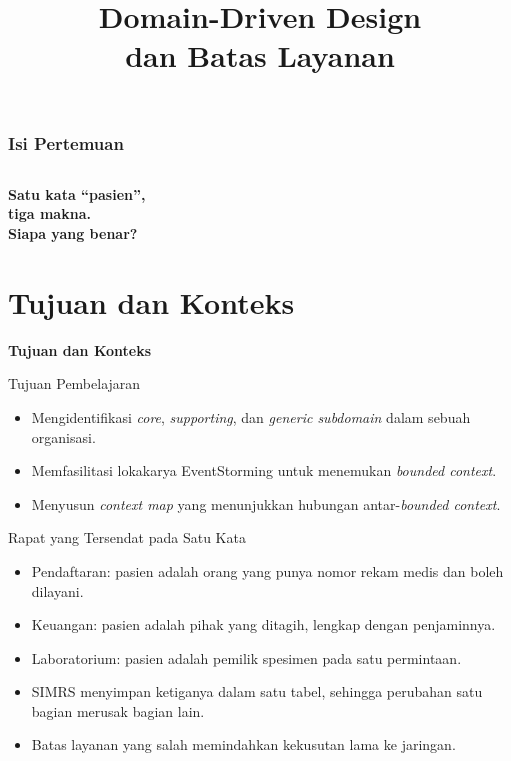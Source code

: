 \documentclass[aspectratio=169, table, 12pt]{beamer}
\title{\Huge Domain-Driven Design\\ \vspace{10pt} dan Batas Layanan}
\begin{document}
\frame{\titlepage}

\begin{frame}
  \frametitle{Isi Pertemuan}
  \vspace{14pt}
  \begin{columns}[t]
    {\small\tableofcontents[sections={1-4}]}

    {\small\tableofcontents[sections={5-8}]}
  \end{columns}
\end{frame}

\begin{frame}{\hfill}
  \centering
  \Huge{\textbf{Satu kata ``pasien'',\\tiga makna.\\Siapa yang benar?}}
\end{frame}

\section{Tujuan dan Konteks}

\begin{frame}{\hfill}
  \centering
  \Huge{\textbf{Tujuan dan Konteks}}
\end{frame}

\begin{frame}{{\Large Tujuan Pembelajaran}}
  \vspace{10pt}
  \begin{itemize}
    \item Mengidentifikasi \textit{core}, \textit{supporting}, dan \textit{generic
          subdomain} dalam sebuah organisasi.
    \item Memfasilitasi lokakarya EventStorming untuk menemukan \textit{bounded
          context}.
    \item Menyusun \textit{context map} yang menunjukkan hubungan
          antar-\textit{bounded context}.
  \end{itemize}
\end{frame}

\begin{frame}{{\Large Rapat yang Tersendat pada Satu Kata}}
  \vspace{10pt}
  \begin{itemize}
    \item Pendaftaran: pasien adalah orang yang punya nomor rekam medis dan boleh
          dilayani.
    \item Keuangan: pasien adalah pihak yang ditagih, lengkap dengan penjaminnya.
    \item Laboratorium: pasien adalah pemilik spesimen pada satu permintaan.
    \item SIMRS menyimpan ketiganya dalam satu tabel, sehingga perubahan satu bagian
          merusak bagian lain.
    \item Batas layanan yang salah memindahkan kekusutan lama ke jaringan.
  \end{itemize}
\end{frame}
\end{document}
